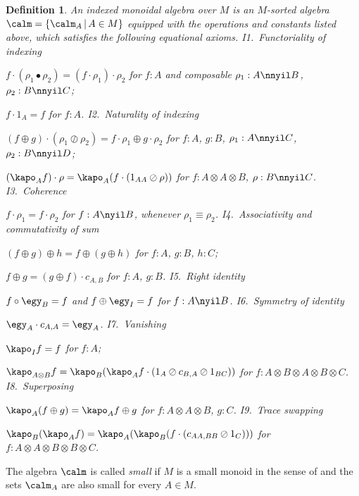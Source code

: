 \documentclass{eptcs}
\newtheorem{definition}{Definition}
\begin{document}
\begin{definition}
{\em An {\em indexed monoidal algebra\/} over $M$ is an $M$-sorted algebra $\calm =
\{\calm _A\,|\,A\in M\}$ equipped with the operations and constants listed above,
which satisfies the following equational axioms.
\vsp\newline
  I1.\ {\em Functoriality of indexing}

   $f\cdot(\rho_1\bullet \rho _2)=(f\cdot \rho _1)\cdot \rho_2$ for $f:A$ and
   composable $\rho_1:A\nnyil B$, $\rho _2:B\nnyil C$;

   $f\cdot 1_{A}=f$ for $f:A$.
\newline
 I2.\ {\em Naturality of indexing}

   $(f\oplus g)\cdot (\rho _1\oslash \rho _2)=f\cdot \rho _1\oplus g\cdot \rho_2$
    for $f:A$, $g:B$, $\rho _1:A\nnyil C$, $\rho _2:B\nnyil D$;

   $(\kapo _A f)\cdot \rho =\kapo _A(f\cdot (1_{AA}\oslash \rho ))$
    for $f:A\otimes A\otimes B$, $\rho :B\nnyil C$.
\newline
I3.\ {\em Coherence}

    $f\cdot \rho _1 =f\cdot \rho _2 $ for $f:A\nyil B$, whenever $\rho_1\equiv \rho _2$.
\newline
 I4.\ {\em Associativity and commutativity of sum}

    $(f\oplus g)\oplus h=f\oplus (g\oplus h)$ for $f:A$, $g:B$, $h:C$;

    $f\oplus g=(g\oplus f)\cdot c_{A,B}$ for $f:A$, $g:B$.
\newline
 I5.\ {\em Right identity}

    $f\circ \egy _B=f$ and $f\oplus \egy _I =f$ for $f:A\nyil B$.
\newline
 I6.\ {\em Symmetry of identity}

    $\egy _A\cdot c_{A,A}=\egy _A$.
\newline
 I7.\ {\em Vanishing} 

    $\kapo _I f=f$ for $f:A$;

    $\kapo _{A\otimes B}f=\kapo _B(\kapo _A f\cdot (1_A\oslash c_{B,A}\oslash 1_{BC}))$
     for $f:A\otimes B\otimes A\otimes B\otimes C$.
\newline
 I8.\ {\em Superposing}

    $\kapo _A(f\oplus g)=\kapo _A f\oplus g$ for $f:A\otimes A\otimes B$, $g:C$.
\newline
 I9.\ {\em Trace swapping}

    $\kapo _B(\kapo _Af)=\kapo _A(\kapo _B(f\cdot (c_{AA,BB}\oslash 1_C)))$
    for $f:A\otimes A\otimes B\otimes B\otimes C$.
}
\end{definition}
The algebra $\calm $ is called {\em small\/} if $M$ is a small monoid 
in the sense of \cite{mcl} and the
sets $\calm _A$ are also small for every $A\in M$.
\end{document}
